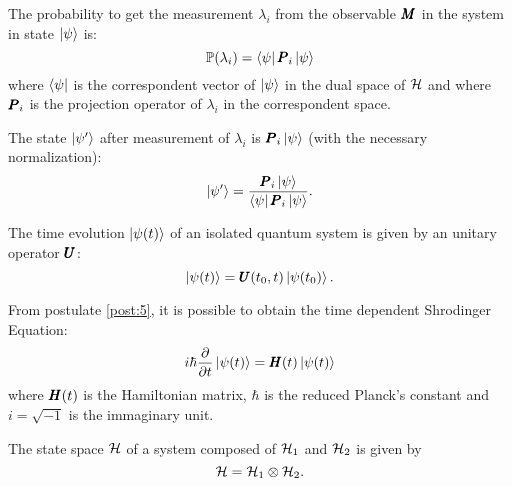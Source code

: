     \begin{postulate}
        The probability to get the measurement $\lambda_i$ from the observable 
        $\Operator{M}$ in the system in state $\ket{\psi}$ is:
        \begin{equation*}
            \mathbb{P}(\lambda_i)=\bra{\psi}\Operator{P}_i\ket{\psi}
        \end{equation*}
        where $\bra{\psi}$ is the correspondent vector of $\ket{\psi}$ in the 
        dual space of $\mathcal{H}$ and where $\Operator{P}_i$ is the projection operator
        of $\lambda_i$ in the correspondent space.
        \label{post:3}
    \end{postulate}

    \begin{postulate}
        The state $\ket{\psi'}$ after measurement of $\lambda_i$ is $\Operator{P}_i\ket{\psi}$ (with the
        necessary normalization):
        \begin{equation*}
            \ket{\psi'}=\frac{\Operator{P}_i\ket{\psi}}{\bra{\psi}\Operator{P}_i\ket{\psi}}.
        \end{equation*}
        \label{post:4}
    \end{postulate}

    \begin{postulate}
        The time evolution $\ket{\psi(t)}$ of an isolated quantum system is given by an unitary operator
        $\Operator{U}$:
        \begin{equation*}
            \ket{\psi(t)}=\Operator{U}(t_0,t)\ket{\psi(t_0)}.
        \end{equation*}
        \label{post:5}
    \end{postulate}
    \begin{observation*}
        From postulate \ref{post:5}, it is possible to obtain the time dependent Shrodinger Equation:
        \begin{equation*}
            i\hbar\partialderivative{}{t}\ket{\psi(t)}=\Operator{H}(t)\ket{\psi(t)}
        \end{equation*}
        where $\Operator{H}(t)$ is the Hamiltonian matrix, $\hbar$ is the reduced Planck's constant and $i=\sqrt{-1}$
        is the immaginary unit.
    \end{observation*}

    \begin{postulate}
        The state space $\mathcal{H}$ of a system composed of $\mathcal{H}_1$ and $\mathcal{H}_2$ is given by
        \begin{equation*}
            \mathcal{H}=\mathcal{H}_1\otimes\mathcal{H}_2.
        \end{equation*}
        \label{post:6}
    \end{postulate}

